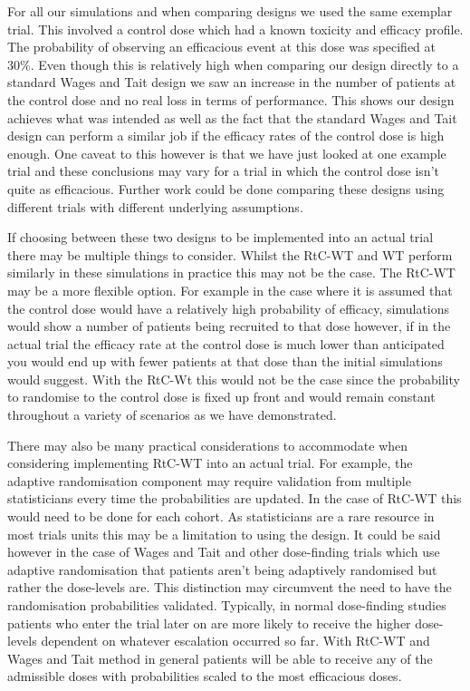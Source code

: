 For all our simulations and when comparing designs we used the same exemplar trial. This involved a control dose which had a known toxicity and efficacy profile. The probability of observing an efficacious event at this dose was specified at 30\%. Even though this is relatively high when comparing our design directly to a standard Wages and Tait design we saw an increase in the number of patients at the control dose and no real loss in terms of performance. This shows our design achieves what was intended as well as the fact that the standard Wages and Tait design can perform a similar job if the efficacy rates of the control dose is high enough. One caveat to this however is that we have just looked at one example trial and these conclusions may vary for a trial in which the control dose isn't quite as efficacious. Further work could be done comparing these designs using different trials with different underlying assumptions. 

If choosing between these two designs to be implemented into an actual trial there may be multiple things to consider. Whilst the RtC-WT and WT perform similarly in these simulations in practice this may not be the case. The RtC-WT may be a more flexible option. For example in the case where it is assumed that the control dose would have a relatively high probability of efficacy, simulations would show a number of patients being recruited to that dose however, if in the actual trial the efficacy rate at the control dose is much lower than anticipated you would end up with fewer patients at that dose than the initial simulations would suggest. With the RtC-Wt this would not be the case since the probability to randomise to the control dose is fixed up front and would remain constant throughout a variety of scenarios as we have demonstrated.

There may also be many practical considerations to accommodate when considering implementing RtC-WT into an actual trial. For example, the adaptive randomisation component may require validation from multiple statisticians every time the probabilities are updated. In the case of RtC-WT this would need to be done for each cohort. As statisticians are a rare resource in most trials units this may be a limitation to using the design. It could be said however in the case of Wages and Tait and other dose-finding trials which use adaptive randomisation that patients aren't being adaptively randomised but rather the dose-levels are. This distinction may circumvent the need to have the randomisation probabilities validated. Typically, in normal dose-finding studies patients who enter the trial later on are more likely to receive the higher dose-levels dependent on whatever escalation occurred so far. With RtC-WT and Wages and Tait method in general patients will be able to receive any of the admissible doses with probabilities scaled to the most efficacious doses. 


